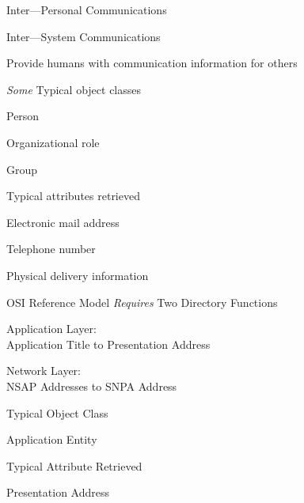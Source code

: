\begin{bwslide}

\begin{nrtc}
\item	Inter---Personal Communications
\item	Inter---System Communications
\end{nrtc}
\end{bwslide}

\begin{bwslide}

\begin{nrtc}
\item	Provide humans with communication information for others
\item	{\em Some} Typical object classes
	\begin{nrtc}
	\item	Person
	\item	Organizational role
	\item	Group
	\end{nrtc}
\item	Typical attributes retrieved
	\begin{nrtc}
	\item	Electronic mail address
	\item	Telephone number
	\item	Physical delivery information
	\end{nrtc}
\end{nrtc}
\end{bwslide}

\begin{bwslide}

\begin{nrtc}
\item	OSI Reference Model \emph{Requires} Two Directory Functions
	\begin{nrtc}
	\item	Application Layer: \\ Application Title to Presentation Address
	\item	Network Layer: \\ NSAP Addresses to SNPA Address
	\end{nrtc}
\item	Typical Object Class
	\begin{nrtc}
	\item	Application Entity
	\end{nrtc}
\item	Typical Attribute Retrieved
	\begin{nrtc}
	\item	Presentation Address
	\end{nrtc}
\end{nrtc}
\end{bwslide}

